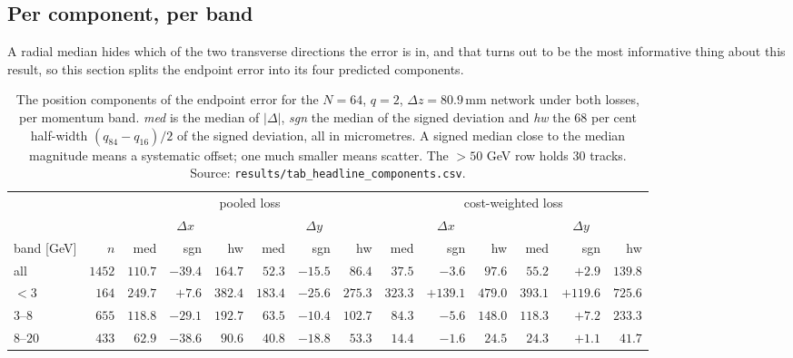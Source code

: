 \documentclass[11pt,a4paper]{article}
\newcommand{\mm}{\ensuremath{\,\mathrm{mm}}}
\begin{document}
\subsection{Per component, per band}
\label{sec:results-components}

A radial median hides which of the two transverse directions the error is in,
and that turns out to be the most informative thing about this result, so this
section splits the endpoint error into its four predicted components.

\begin{table}[tbp]
  \centering
  \caption{The position components of the endpoint error for the $N = 64$,
  $q = 2$, $\Delta z = 80.9\mm$ network under both losses, per momentum band.
  \emph{med} is the median of $|\Delta|$, \emph{sgn} the median of the signed
  deviation and \emph{hw} the $68$ per cent half-width $(q_{84} - q_{16})/2$ of
  the signed deviation, all in micrometres. A signed median close to the median
  magnitude means a systematic offset; one much smaller means scatter. The
  $>50$ GeV row holds $30$ tracks. Source:
  \texttt{results/tab\_headline\_components.csv}.}
  \label{tab:comppos}
  \footnotesize
  \setlength{\tabcolsep}{3pt}
  \begin{tabular}{lrrrrrrrrrrrrr}
    \toprule
    & & \multicolumn{6}{c}{pooled loss} & \multicolumn{6}{c}{cost-weighted loss} \\
    \cmidrule(lr){3-8}\cmidrule(lr){9-14}
    & & \multicolumn{3}{c}{$\Delta x$} & \multicolumn{3}{c}{$\Delta y$}
      & \multicolumn{3}{c}{$\Delta x$} & \multicolumn{3}{c}{$\Delta y$} \\
    \cmidrule(lr){3-5}\cmidrule(lr){6-8}\cmidrule(lr){9-11}\cmidrule(lr){12-14}
    band [GeV] & $n$ & med & sgn & hw & med & sgn & hw & med & sgn & hw & med & sgn & hw \\
    \midrule
    all        & $1452$ & $110.7$ & $-39.4$ & $164.7$ & $52.3$ & $-15.5$ & $86.4$  & $37.5$  & $-3.6$   & $97.6$  & $55.2$  & $+2.9$   & $139.8$ \\
    $<3$       & $164$  & $249.7$ & $+7.6$  & $382.4$ & $183.4$ & $-25.6$ & $275.3$ & $323.3$ & $+139.1$ & $479.0$ & $393.1$ & $+119.6$ & $725.6$ \\
    $3$--$8$   & $655$  & $118.8$ & $-29.1$ & $192.7$ & $63.5$ & $-10.4$ & $102.7$ & $84.3$  & $-5.6$   & $148.0$ & $118.3$ & $+7.2$   & $233.3$ \\
    $8$--$20$  & $433$  & $62.9$  & $-38.6$ & $90.6$  & $40.8$ & $-18.8$ & $53.3$  & $14.4$  & $-1.6$   & $24.5$  & $24.3$  & $+1.1$   & $41.7$ \\

\end{tabular}
\end{table}
\end{document}
